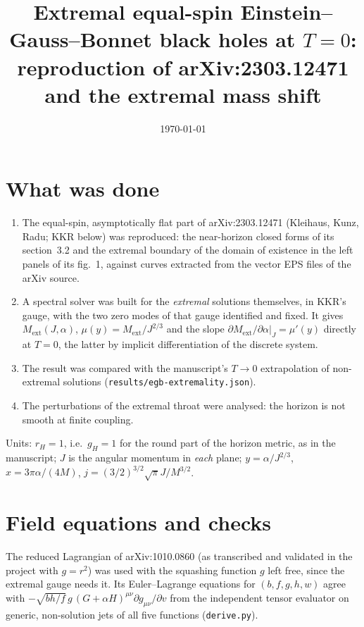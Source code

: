 \documentclass[11pt,a4paper]{article}
\title{Extremal equal-spin Einstein--Gauss--Bonnet black holes at $T=0$:\\
reproduction of arXiv:2303.12471 and the extremal mass shift}
\author{}
\date{\today}
\newcommand{\ext}{\mathrm{ext}}
\begin{document}
\maketitle

\section{What was done}

\begin{enumerate}
\item The equal-spin, asymptotically flat part of arXiv:2303.12471
(Kleihaus, Kunz, Radu; KKR below) was reproduced: the near-horizon closed forms
of its section~3.2 and the extremal boundary of the domain of existence in the
left panels of its fig.~1, against curves extracted from the vector EPS files of
the arXiv source.
\item A spectral solver was built for the \emph{extremal} solutions themselves, in
KKR's gauge, with the two zero modes of that gauge identified and fixed. It gives
$M_\ext(J,\alpha)$, $\mu(y)=M_\ext/J^{2/3}$ and the slope
$\partial M_\ext/\partial\alpha|_J=\mu'(y)$ directly at $T=0$, the latter by
implicit differentiation of the discrete system.
\item The result was compared with the manuscript's $T\to0$ extrapolation of
non-extremal solutions (\texttt{results/egb-extremality.json}).
\item The perturbations of the extremal throat were analysed: the horizon is not
smooth at finite coupling.
\end{enumerate}

\noindent Units: $r_H=1$, i.e.\ $g_H=1$ for the round part of the horizon metric, as in
the manuscript; $J$ is the angular momentum in \emph{each} plane;
$y=\alpha/J^{2/3}$, $x=3\pi\alpha/(4M)$, $j=(3/2)^{3/2}\sqrt\pi J/M^{3/2}$.

\section{Field equations and checks}

The reduced Lagrangian of arXiv:1010.0860 (as transcribed and validated in the
project with $g=r^2$) was used with the squashing function $g$ left free, since
the extremal gauge needs it. Its Euler--Lagrange equations for
$(b,f,g,h,w)$ agree with $-\sqrt{bh/f}\,g\,(G+\alpha H)^{\mu\nu}\partial
g_{\mu\nu}/\partial v$ from the independent tensor evaluator on generic,
non-solution jets of all five functions (\texttt{derive.py}).
\end{document}
